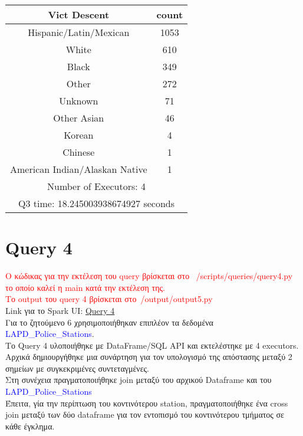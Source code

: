 \documentclass{article}
\begin{document}
\begin{center}
\begin{tabular}{|c|c|}
\hline
\textbf{Vict Descent} & \textbf{count} \\
\hline
Hispanic/Latin/Mexican & 1053 \\
White & 610 \\
Black & 349 \\
Other & 272 \\
Unknown & 71 \\
Other Asian & 46 \\
Korean & 4 \\
Chinese & 1 \\
American Indian/Alaskan Native & 1 \\
\hline
\multicolumn{2}{|c|}{Number of Executors: 4} \\
\multicolumn{2}{|c|}{Q3 time: 18.245003938674927 seconds} \\
\hline
\end{tabular}
\end{center}

\vspace{3cm}

\section{Query 4}

\textcolor{red}{Ο κώδικας για την εκτέλεση του query βρίσκεται στο  /scripts/queries/query4.py το οποίο καλεί η main κατά την εκτέλεση της.} \\
\textcolor{red}{Το output του query 4 βρίσκεται στο /output/output5.py} \\
Link για το Spark UI: 
\href{http://83.212.81.191:18080/history/application_1705357398960_0017/jobs/} {Query 4} \\

Για το ζητούμενο 6 χρησιμοποιήθηκαν επιπλέον τα δεδομένα \textcolor{blue}{LAPD\_Police\_Stations}. \\
Το Query 4 υλοποιήθηκε με DataFrame/SQL API και εκτελέστηκε με 4 executors.  \\
Αρχικά δημιουργήθηκε μια συνάρτηση για τον υπολογισμό της απόστασης μεταξύ 2 σημείων με 
συγκεκριμένες συντεταγμένες. \\
Στη συνέχεια πραγματοποιήθηκε join μεταξύ του αρχικού Dataframe και του \textcolor{blue}{LAPD\_Police\_Stations}\\
Έπειτα, γία την περίπτωση του κοντινότερου station, πραγματοποιήθηκε ένα cross join μεταξύ των δύο dataframe
για τον εντοπισμό του κοντινότερου τμήματος σε κάθε έγκλημα. 
\end{document}
